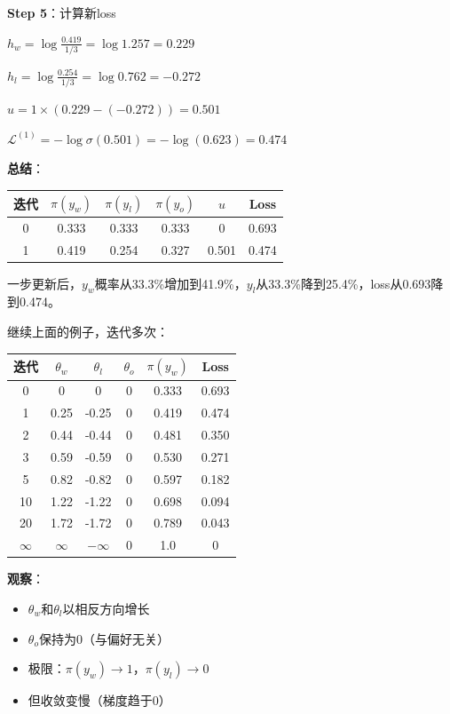 \documentclass[11pt,a4paper]{article}
\theoremstyle{definition}
\begin{document}
\begin{calculation}
\textbf{Step 5}：计算新loss

$h_w = \log \frac{0.419}{1/3} = \log 1.257 = 0.229$

$h_l = \log \frac{0.254}{1/3} = \log 0.762 = -0.272$

$u = 1 \times (0.229 - (-0.272)) = 0.501$

$\mathcal{L}^{(1)} = -\log \sigma(0.501) = -\log(0.623) = 0.474$

\textbf{总结}：
\begin{center}
\begin{tabular}{c|ccc|cc}
\toprule
迭代 & $\pi(y_w)$ & $\pi(y_l)$ & $\pi(y_o)$ & $u$ & Loss \\
\midrule
0 & 0.333 & 0.333 & 0.333 & 0 & 0.693 \\
1 & 0.419 & 0.254 & 0.327 & 0.501 & 0.474 \\
\bottomrule
\end{tabular}
\end{center}

一步更新后，$y_w$概率从33.3\%增加到41.9\%，$y_l$从33.3\%降到25.4\%，loss从0.693降到0.474。
\end{calculation}

\begin{calculation}
继续上面的例子，迭代多次：

\begin{center}
\begin{tabular}{c|ccc|cc}
\toprule
迭代 & $\theta_w$ & $\theta_l$ & $\theta_o$ & $\pi(y_w)$ & Loss \\
\midrule
0 & 0 & 0 & 0 & 0.333 & 0.693 \\
1 & 0.25 & -0.25 & 0 & 0.419 & 0.474 \\
2 & 0.44 & -0.44 & 0 & 0.481 & 0.350 \\
3 & 0.59 & -0.59 & 0 & 0.530 & 0.271 \\
5 & 0.82 & -0.82 & 0 & 0.597 & 0.182 \\
10 & 1.22 & -1.22 & 0 & 0.698 & 0.094 \\
20 & 1.72 & -1.72 & 0 & 0.789 & 0.043 \\
$\infty$ & $\infty$ & $-\infty$ & 0 & 1.0 & 0 \\
\bottomrule
\end{tabular}
\end{center}

\textbf{观察}：
\begin{itemize}
    \item $\theta_w$和$\theta_l$以相反方向增长
    \item $\theta_o$保持为0（与偏好无关）
    \item 极限：$\pi(y_w) \to 1$，$\pi(y_l) \to 0$
    \item 但收敛变慢（梯度趋于0）
\end{itemize}
\end{calculation}
\end{document}
